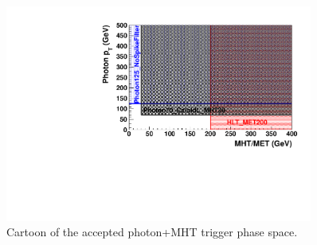  \begin{figure}[!ht]
  \centering
  \includegraphics[width=0.90\textwidth]{figures/photon_mhtphaseplot.pdf}
\caption{Cartoon of the accepted photon+MHT trigger phase space. }
\label{fig:mhtphase}
\end{figure}